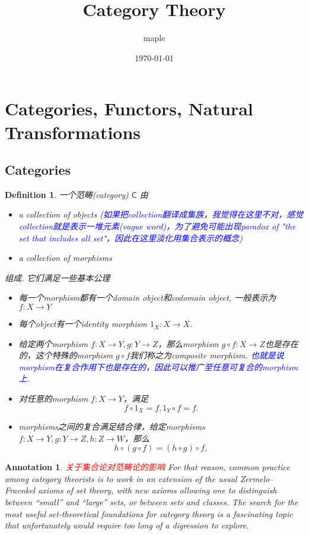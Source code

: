 \documentclass{article}
\title{Category Theory}
\author{maple}
\date{\today}
\newtheorem{definition}[theorem]{Definition}
\newtheorem{annotation}[theorem]{Annotation}
\newcommand*{\cat}[1]{\textsf{#1}\xspace}
\newcommand{\id}{1}
\newcommand*{\xfunc}[4]{{#2}\colon{#3}{#1}{#4}}
\newcommand*{\func}[3]{\xfunc{\to}{#1}{#2}{#3}}
\newcommand*{\idfunc}[1]{\func{\id_{#1}}{#1}{#1}}
\newcommand{\redt}[1]{\textcolor{red}{#1}}
\newcommand{\bluet}[1]{\textcolor{blue}{#1}}
\begin{document}
\maketitle
\tableofcontents


\newpage
\section{Categories, Functors, Natural Transformations}

\subsection{Categories}

\begin{definition}
\rm 一个范畴(category) $\cat{C}$ 由
\begin{itemize}
	\item a collection of objects (\bluet{如果把collection翻译成集族，我觉得在这里不对，感觉collection就是表示一堆元素(vague word)，为了避免可能出现paradox of "the set that includes all set"，因此在这里淡化用集合表示的概念})
	\item a collection of morphisms
\end{itemize}
组成. 它们满足一些基本公理
\begin{itemize}
	\item 每一个morphism都有一个domain object和codomain object, 一般表示为$\func{f}{X}{Y}$
	\item 每个object有一个identity morphism $\idfunc{X}$. 
	\item 给定两个morphism $\func{f}{X}{Y}, \func{g}{Y}{Z}$，那么morphism $\func{g \circ f }{X}{Z}$也是存在的，这个特殊的morphism $g \circ f $我们称之为composite morphism. \bluet{也就是说morphism在复合作用下也是存在的，因此可以推广至任意可复合的morphism上}.
	\item 对任意的morphism $\func{f}{X}{Y}$，满足
	$$
		f\circ\id_X = f, \id_Y \circ f = f. 
	$$
	\item morphisms之间的复合满足结合律，给定morphisms $\func{f}{X}{Y}, \func{g}{Y}{Z}, \func{h}{Z}{W}$，那么
	$$
		h \circ (g \circ f) = (h \circ g) \circ f,
	$$
\end{itemize}
\end{definition}


\begin{annotation}
\rm \redt{关于集合论对范畴论的影响} For that reason, common practice among category theorists is to work in an extension of the usual Zermelo–Fraenkel axioms of set theory, with new axioms allowing one to distinguish between “small” and “large” sets, or between sets and classes. The search for the most useful set-theoretical foundations for category theory is a fascinating topic that unfortunately would require too long of a digression to explore.
\end{annotation}
\end{document}
